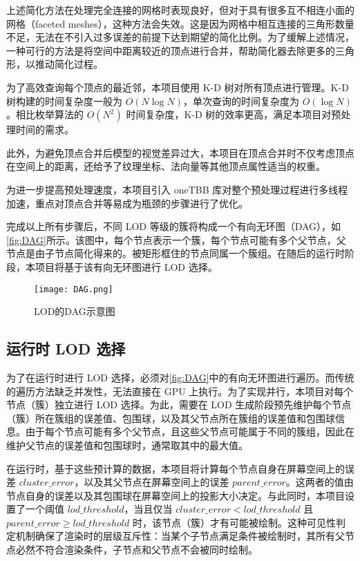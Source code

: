 上述简化方法在处理完全连接的网格时表现良好，但对于具有很多互不相连小面的网格（faceted meshes），这种方法会失效。这是因为网格中相互连接的三角形数量不足，无法在不引入过多误差的前提下达到期望的简化比例。为了缓解上述情况，一种可行的方法是将空间中距离较近的顶点进行合并，帮助简化器去除更多的三角形，以推动简化过程。

为了高效查询每个顶点的最近邻，本项目使用 K-D 树对所有顶点进行管理\cite{bentley1975}。K-D 树构建的时间复杂度一般为 $O(N\log N)$，单次查询的时间复杂度为 $O(\log N)$。相比枚举算法的 $O(N^2)$ 时间复杂度，K-D 树的效率更高，满足本项目对预处理时间的需求。

此外，为避免顶点合并后模型的视觉差异过大，本项目在顶点合并时不仅考虑顶点在空间上的距离，还给予了纹理坐标、法向量等其他顶点属性适当的权重。

为进一步提高预处理速度，本项目引入 oneTBB 库对整个预处理过程进行多线程加速\cite{oneTBB}，重点对顶点合并等易成为瓶颈的步骤进行了优化。

完成以上所有步骤后，不同 LOD 等级的簇将构成一个有向无环图（DAG），如\autoref{fig:DAG}所示\cite{WangXi2022}。该图中，每个节点表示一个簇，每个节点可能有多个父节点，父节点是由子节点简化得来的。被矩形框住的节点同属一个簇组。在随后的运行时阶段，本项目将基于该有向无环图进行 LOD 选择。

\begin{figure}[ht]
    \centering
    \texttt{[image: DAG.png]}
    \caption{\label{fig:DAG}LOD的DAG示意图}
\end{figure}

\subsection{运行时 LOD 选择} \label{subsec:run-time lod select}

\par 为了在运行时进行 LOD 选择，必须对\autoref{fig:DAG}中的有向无环图进行遍历。而传统的遍历方法缺乏并发性，无法直接在 GPU 上执行。为了实现并行，本项目对每个节点（簇）独立进行 LOD 选择。为此，需要在 LOD 生成阶段预先维护每个节点（簇）所在簇组的误差值、包围球，以及其父节点所在簇组的误差值和包围球信息\cite{WangQian2016}。由于每个节点可能有多个父节点，且这些父节点可能属于不同的簇组，因此在维护父节点的误差值和包围球时，通常取其中的最大值。

在运行时，基于这些预计算的数据，本项目将计算每个节点自身在屏幕空间上的误差 $cluster\_error$，以及其父节点在屏幕空间上的误差 $parent\_error$。这两者的值由节点自身的误差以及其包围球在屏幕空间上的投影大小决定。与此同时，本项目设置了一个阈值 $lod\_threshold$，当且仅当 $cluster\_error < lod\_threshold$ 且 $parent\_error \geq lod\_threshold$ 时，该节点（簇）才有可能被绘制。这种可见性判定机制确保了渲染时的层级互斥性：当某个子节点满足条件被绘制时，其所有父节点必然不符合渲染条件，子节点和父节点不会被同时绘制。

